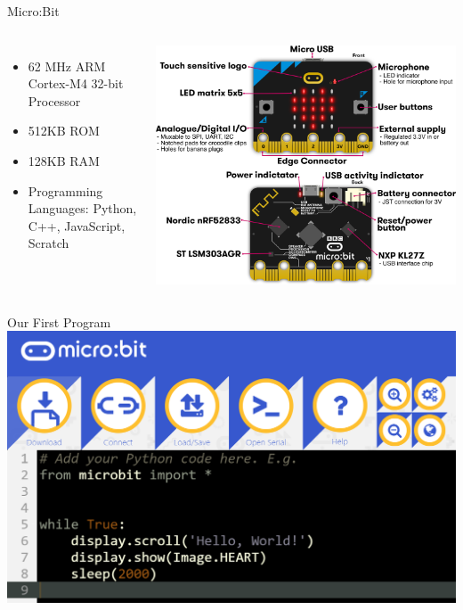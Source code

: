 \documentclass[handout]{beamer}
\begin{document}
\begin{frame}{Micro:Bit}
    \begin{columns}
    \begin{itemize}
        \item 62 MHz ARM Cortex-M4 32-bit Processor
        \item 512KB ROM
        \item 128KB RAM
        \item Programming Languages: Python, C++, JavaScript, Scratch
    \end{itemize}
    \includegraphics[width=\textwidth]{images/microbit-overview-2}
    \end{columns}    
\end{frame}

\begin{frame}{Our First Program}
    \includegraphics[max width=\textwidth, max height=\textheight]{images/prog1}
\end{frame}
\end{document}
